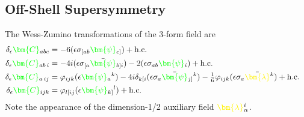 \documentclass[letter,12pt]{article} %
\def\physical#1{ {\color{green} {\bm {#1}} } }
\def\auxiliary#1{ {\color{yellow} {\bm {#1}} } }
\def\CXXX{ \physical{C} }
\def\CXXY{ \physical{C} }
\def\CXYY{ \physical{C} }
\def\CYYY{ \physical{C} }
\def\grinoXX{ \physical{\psi} }
\def\grinoXY{ \physical{\psi} }
\def\grinoYX{ \physical{\psi} }
\def\grinoYY{ \physical{\psi} }
\def\l{ \auxiliary{\lambda} }
\begin{document}
\subsection{Off-Shell Supersymmetry}

The Wess-Zumino transformations of the 3-form field are 
{%
\begin{align}
\delta_\epsilon \CXXX_{abc} &= -6 (\epsilon \sigma_{[ab} \grinoXX_{c]})
	+\mathrm{h.c.}
\cr
\delta_\epsilon \CXXY_{ab\, i} &= - 4i (\epsilon \sigma_{[a} \bar \grinoXY_{b] i}) 
	-2 (\epsilon \sigma_{ab} \grinoYX_{i})
	+\mathrm{h.c.}
\cr
\delta_\epsilon \CXYY_{a\, ij} &= \varphi_{ijk} (\epsilon \grinoXY_{a}{}^k ) 
	-4i\delta_{k[i} (\epsilon \sigma_{a} \bar \grinoYY_{j]}{}^k)
	-\tfrac16 \varphi_{ijk} (\epsilon \sigma_{a} \bar \l_{}^k)
	+\mathrm{h.c.}
\cr
\delta_\epsilon \CYYY_{ijk} &= \varphi_{l[ij} (\epsilon \grinoYY_{k]}{}^l)
	+\mathrm{h.c.}
\nonumber	
\end{align}
}
Note the appearance of the dimension-1/2 auxiliary field $\l_\alpha^i$. 
\end{document}
